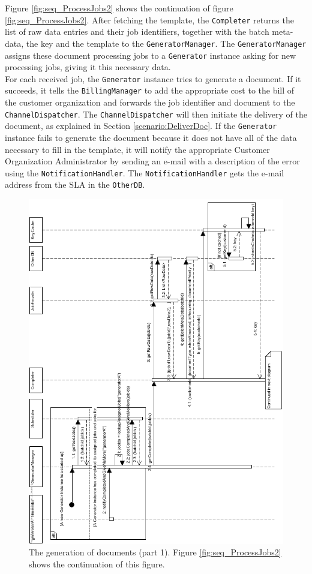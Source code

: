 \documentclass[a4paper,10pt]{article}
\begin{document}
Figure \ref{fig:seq_ProcessJobs2} shows the continuation of figure \ref{fig:seq_ProcessJobs2}. After fetching the template, the \texttt{Completer} returns the list of raw data entries and their job identifiers, together with the batch meta-data, the key and the template to the \texttt{GeneratorManager}. The \texttt{GeneratorManager} assigns these document processing jobs to a \texttt{Generator} instance asking for new processing jobs, giving it this necessary data.\\
For each received job, the \texttt{Generator} instance tries to generate a document. If it succeeds, it tells the \texttt{BillingManager} to add the appropriate cost to the bill of the customer organization and forwards the job identifier and document to the \texttt{ChannelDispatcher}. The \texttt{ChannelDispatcher} will then initiate the delivery of the document, as explained in Section \ref{scenario:DeliverDoc}. If the \texttt{Generator} instance fails to generate the document because it does not have all of the data necessary to fill in the template, it will notify the appropriate Customer Organization Administrator by sending an  e-mail with a description of the error using the \texttt{NotificationHandler}. The \texttt{NotificationHandler} gets the e-mail address from the SLA in the \texttt{OtherDB}.

\begin{figure}[!htp]
    \centering
    \includegraphics[width=\textwidth]{ProcessJobs1.png}
    \caption{The generation of documents (part 1). Figure \ref{fig:seq_ProcessJobs2} shows the continuation of this figure.
        }\label{fig:seq_ProcessJobs1}
\end{figure}
\end{document}
